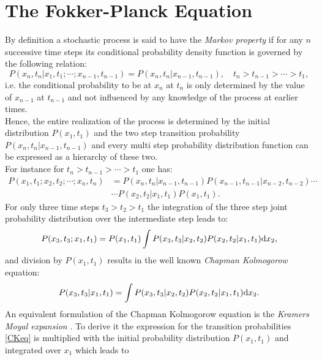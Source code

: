 \section{The Fokker-Planck Equation}
\label{The_Fokker_Planck_Equation}
By definition a stochastic process is said to have the \emph{Markov property} if for any $n$ successive time steps its conditional probability density function is governed by the following relation:
\begin{equation}
    P(x_{n},t_{n}|x_{1},t_{1};\cdots;x_{n-1},t_{n-1}) = P(x_{n},t_{n}|x_{n-1},t_{n-1}), \quad t_{n}>t_{n-1}> \cdots >t_{1},
    \label{}
\end{equation}
i.e. the conditional probability to be at $x_n$ at $t_n$ is only determined by the value of $x_{n-1}$ at $t_{n-1}$ and not influenced by any knowledge of the process at earlier times.\\
Hence, the entire realization of the process is determined by the initial distribution $P(x_1,t_1)$ and the two step transition probability $P(x_{n},t_{n}|x_{n-1},t_{n-1})$ and every multi step probability distribution function can be expressed as a hierarchy of these two. \\
For instance for $ t_n > t_{n-1} > \cdots > t_1$ one has:
\begin{align}
    P(x_1,t_1;x_2,t_2;\cdots;x_n,t_n) &= P(x_n,t_n|x_{n-1},t_{n-1})P(x_{n-1},t_{n-1}|x_{n-2},t_{n-2}) \cdots \nonumber \\
                                      & \cdots P(x_2,t_2|x_1,t_1)P(x_1,t_1).
    \label{hierarchy}
\end{align}
For only three time steps $t_3>t_2>t_1$ the integration of the three step joint probability distribution over the intermediate step leads to:
\begin{equation}
    P(x_3,t_3;x_1,t_1) = P(x_1,t_1)\int P(x_3,t_3|x_2,t_2) P(x_2,t_2|x_1,t_1) {\rm d} x_2,
\end{equation}
and division by $P(x_1,t_1)$ results in the well known \emph{Chapman Kolmogorow} equation:
\begin{equation}
    P(x_3,t_3|x_1,t_1) = \int P(x_3,t_3|x_2,t_2) P(x_2,t_2|x_1,t_1) {\rm d} x_2.
    \label{CKeq}
\end{equation}
An equivalent formulation of the Chapman Kolmogorow equation is the \emph{Kramers Moyal expansion} \cite{Kramers1940, Moyal1949}. To derive it the expression for the transition probabilities \eqref{CKeq} is multiplied with the initial probability distribution $P(x_1,t_1)$ and integrated over $x_1$ which leads to
